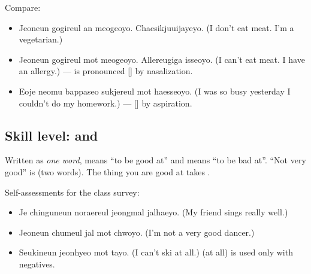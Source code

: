 \begin{example}[\ko{안} vs.\ \ko{못}]
Compare:
\begin{itemize}
  \item {} Jeoneun gogireul an meogeoyo.
        Chaesikjuuijayeyo. (I don't eat meat. I'm a vegetarian.)
  \item {} Jeoneun gogireul mot meogeoyo.
        Allereugiga isseoyo. (I can't eat meat. I have an allergy.) ---  is
        pronounced [] by nasalization.
  \item {} Eoje neomu bappaseo sukjereul mot
        haesseoyo. (I was so busy yesterday I couldn't do my homework.) --- []
        by aspiration.
\end{itemize}
\end{example}

\subsection{Skill level:  and }

Written as \emph{one word},  means ``to be good at'' and  means ``to
be bad at''. ``Not very good'' is  (two words). The thing you are good at
takes .

\begin{center}
\end{center}

\begin{example}[Skill]
Self-assessments for the class survey:
\begin{itemize}
  \item {} Je chinguneun noraereul jeongmal jalhaeyo. (My
        friend sings really well.)
  \item {} Jeoneun chumeul jal mot chwoyo. (I'm not a very good
        dancer.)
  \item {} Seukineun jeonhyeo mot tayo. (I can't ski at all.)
         (at all) is used only with negatives.
\end{itemize}
\end{example}

